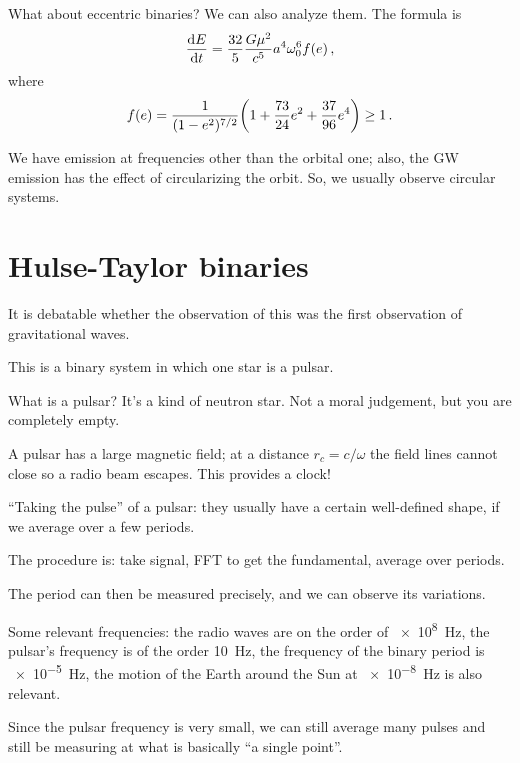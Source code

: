 \documentclass[main.tex]{subfiles}
\begin{document}

What about eccentric binaries? 
We can also analyze them. The formula is 
%
\begin{align}
\dv{E}{t} = \frac{32}{5} \frac{G \mu^2}{c^{5}} a^{4} \omega_0^{6} f(e)
\,,
\end{align}
%
where 
%
\begin{align}
f(e) = \frac{1}{(1 - e^2)^{7/2}} \qty(1 + \frac{73}{24} e^2 + \frac{37}{96} e^{4}) \geq 1 
\,.
\end{align}

We have emission at frequencies other than the orbital one; also, the GW emission has the effect of circularizing the orbit. 
So, we usually observe circular systems. 

\section{Hulse-Taylor binaries}

It is debatable whether the observation of this was the first observation of gravitational waves. 

This is a binary system in which one star is a pulsar. 

What is a pulsar? It's a kind of neutron star.
Not a moral judgement, but you are completely empty.

A pulsar has a large magnetic field; at a distance \(r_c = c/\omega \) the field lines cannot close so a radio beam escapes. 
This provides a clock!

``Taking the pulse'' of a pulsar: they usually have a certain well-defined shape, if we average over a few periods. 

The procedure is: take signal, FFT to get the fundamental, average over periods. 

The period can then be measured precisely, and we can observe its variations. 

Some relevant frequencies: the radio waves are on the order of \SI{e8}{Hz}, the pulsar's frequency is of the order \SI{10}{Hz}, the frequency of the binary period is \SI{e-5}{Hz}, the motion of the Earth around the Sun at \SI{e-8}{Hz} is also relevant. 

Since the pulsar frequency is very small, we can still average many pulses and still be measuring at what is basically ``a single point''. 
\end{document}
